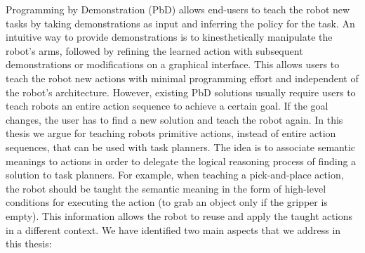 Programming by Demonstration (PbD) allows end-users to teach the robot new tasks by taking demonstrations as input and inferring the policy for the task.
An intuitive way to provide demonstrations is to kinesthetically manipulate the robot's arms, followed by refining the learned action with subsequent demonstrations or modifications on a graphical interface.
This allows users to teach the robot new actions with minimal programming effort and independent of the robot's architecture.
However, existing PbD solutions usually require users to teach robots an entire action sequence to achieve a certain goal.
If the goal changes, the user has to find a new solution and teach the robot again.
In this thesis we argue for teaching robots primitive actions, instead of entire action sequences, that can be used with task planners.
The idea is to associate semantic meanings to actions in order to delegate the logical reasoning process of finding a solution to task planners.
For example, when teaching a pick-and-place action, the robot should be taught the semantic meaning in the form of high-level conditions for executing the action (\eg to grab an object only if the gripper is empty). %
This information allows the robot to reuse and apply the taught actions in a different context.
We have identified two main aspects that we address in this thesis:
